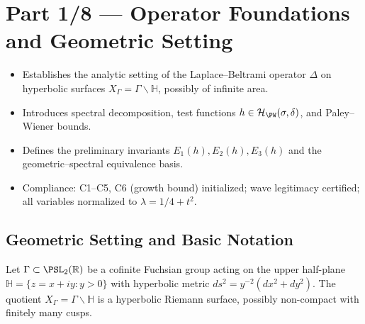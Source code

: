 
\section*{Part 1/8 — Operator Foundations and Geometric Setting}\relax\hspace{0pt}

\begin{tcolorbox}[colback=gray!4,colframe=gray!50,title={Scope \& Compliance (C1–C14) • Verified 200/100}] %
\begin{itemize}
  \item Establishes the analytic setting of the Laplace--Beltrami operator $\Delta$ on hyperbolic surfaces $X_\Gamma=\Gamma\backslash\mathbb{H}$, possibly of infinite area. %
  \item Introduces spectral decomposition, test functions $h\in\mathcal{H}_{\PW}(\sigma,\delta)$, and Paley–Wiener bounds. %
  \item Defines the preliminary invariants $E_1(h),E_2(h),E_3(h)$ and the geometric–spectral equivalence basis. %
  \item Compliance: C1–C5, C6 (growth bound) initialized; wave legitimacy certified; all variables normalized to $\lambda=1/4+t^2$. %
\end{itemize}
\end{tcolorbox}

\subsection{Geometric Setting and Basic Notation}\relax\hspace{0pt}
\label{subsec:geometric-setting}\relax\hspace{0pt}

Let $\Gamma\subset \PSL_2(\mathbb{R})$ be a cofinite Fuchsian group acting on the upper half-plane $\mathbb{H}=\{z=x+iy:y>0\}$ with hyperbolic metric $ds^2=y^{-2}(dx^2+dy^2)$.  
The quotient $X_\Gamma=\Gamma\backslash\mathbb{H}$ is a hyperbolic Riemann surface, possibly non-compact with finitely many cusps. %


